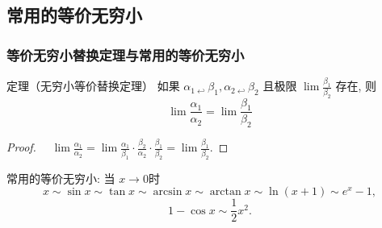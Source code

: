 \documentclass[
10pt,
aspectratio=43,
]{beamer}
\begin{document}
\subsection{常用的等价无穷小}

\begin{frame}
	\frametitle{等价无穷小替换定理与常用的等价无穷小}
	
	\begin{block}{定理（无穷小等价替换定理）}
		如果 $\alpha_{1 \hookleftarrow} \beta_1, \alpha_{2 \hookleftarrow} \beta_2$ 且极限 $\lim \frac{\beta_1}{\beta_2}$ 存在, 则
		$$
		\lim \frac{\alpha_1}{\alpha_2}=\lim \frac{\beta_1}{\beta_2}
		$$
	\end{block}
	\pause
	\begin{proof}
		$\quad \lim \frac{\alpha_1}{\alpha_2}=\lim \frac{\alpha_1}{\beta_1} \cdot \frac{\beta_2}{\alpha_2} \cdot \frac{\beta_1}{\beta_2}=\lim \frac{\beta_1}{\beta_2}$.
		
	\end{proof}
	\pause
	常用的等价无穷小:
	当 $x \rightarrow 0$时
	$$
	x \sim \sin x \sim \tan x \sim \arcsin x \sim \arctan x \sim \ln (x+1) \sim e^x-1,
	$$
	$$
	1-\cos x \sim \frac{1}{2} x^2.
	$$
	
\end{frame}
\end{document}
